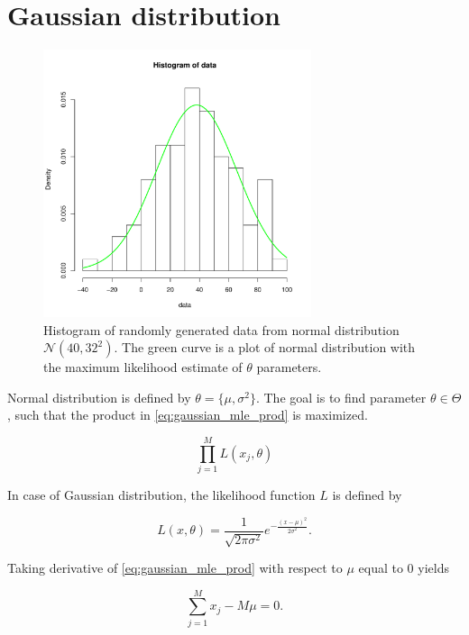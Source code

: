 \documentclass[thesis=B,english]{FITthesis}[2012/06/26]
\begin{document}
\section{Gaussian distribution}

\begin{figure}
	\centering
 	\includegraphics[width=0.7\textwidth]{normal_mle}
 	\caption{Histogram of randomly generated data from normal distribution $\mathcal{N}(40,32^2)$. The green curve is a plot of normal distribution with the maximum likelihood estimate of $\theta$ parameters.}
 	\label{fig:normal_mle}
\end{figure}

Normal distribution is defined by $\theta = \{\mu, \sigma^2\}$. The goal is to find parameter $\theta \in \Theta$, such that the product in \ref{eq:gaussian_mle_prod} is maximized.

\begin{equation} \label{eq:gaussian_mle_prod}
\prod_{j=1}^{M} L(x_j, \theta)
\end{equation}

In case of Gaussian distribution, the likelihood function $L$ is defined by

\begin{equation}
L(x, \theta) = \frac{1}{\sqrt{2 \pi \sigma^2}}e^{-\frac{(x-\mu)^2}{2 \sigma^2}}.
\end{equation}

Taking derivative of \ref{eq:gaussian_mle_prod} with respect to $\mu$ equal to 0 yields

\begin{equation}
\sum_{j=1}^{M}{x_j - M \mu} = 0.
\end{equation}
\end{document}
